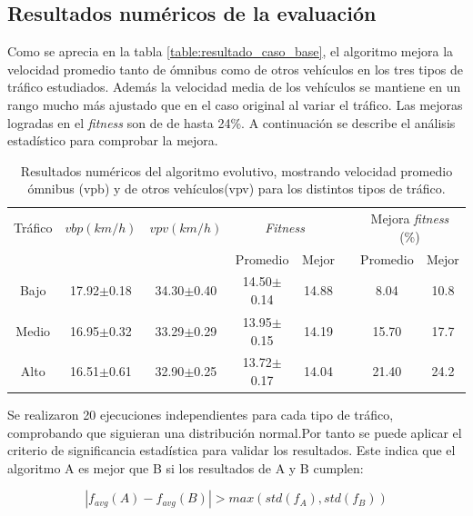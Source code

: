 \subsection{Resultados numéricos de la evaluación }

Como se aprecia en la tabla \ref{table:resultado_caso_base}, el algoritmo mejora la velocidad promedio tanto de ómnibus como de otros vehículos en los tres tipos de tráfico estudiados. Además la velocidad media de los vehículos se mantiene en un rango mucho más ajustado que en el caso original al variar el tráfico. Las mejoras logradas en el \emph{fitness} son de de hasta 24\%. A continuación se describe el análisis estadístico para comprobar la mejora.


\begin{table}[H]
	\renewcommand{\arraystretch}{1.2}	
		\centering
	\caption[Resultados numéricos del algoritmo evolutivo]{Resultados numéricos del algoritmo evolutivo, mostrando velocidad promedio ómnibus (vpb) y de otros vehículos(vpv) para los distintos tipos de tráfico. }
	\label{table:resultado_caso_algoritmo}
	\begin{tabular}{cccccccc}
		\hline 
		Tráfico& 
		$vbp(km/h)$& 
		$vpv(km/h)$&
		\multicolumn{2}{c}{\emph{Fitness}}&  & 
		\multicolumn{2}{c}{Mejora \emph{fitness} (\%)}\\  \cline{4-5} \cline{7-8}&     &     & \multicolumn{1}{c}{Promedio} & \multicolumn{1}{c}{Mejor} &  & \multicolumn{1}{c}{Promedio} & \multicolumn{1}{c}{Mejor} \\ \hline
		Bajo & 17.92$\pm$0.18 & 34.30$\pm$0.40 & 14.50$\pm$0.14 & 14.88 & & 8.04 & 10.8  \\
		Medio& 16.95$\pm$0.32 & 33.29$\pm$0.29 & 13.95$\pm$0.15 & 14.19 & & 15.70& 17.7\\ 
		Alto & 16.51$\pm$0.61  & 32.90$\pm$0.25& 13.72$\pm$0.17 & 14.04 & & 21.40& 24.2\\	
		\hline	    
	\end{tabular}
\end{table}

Se realizaron 20 ejecuciones independientes para cada tipo de tráfico, comprobando que siguieran una distribución normal.Por tanto se puede aplicar el criterio de significancia estadística para validar los resultados. Este indica que el
algoritmo A es mejor que B si los resultados de A y B cumplen:

\begin{equation}
\label{eq:funcion_significancia}
\left |f_{avg}(A) - f_{avg}(B)  \right | > max(std(f_A),std(f_B))
\end{equation}

